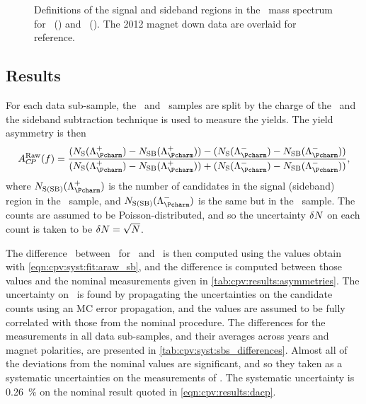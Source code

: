 \begin{figure}
\begin{subfigure}[b]{0.5\textwidth}
    \caption{\ppipi}
    \label{fig:cpv:syst:mass_windows:ppipi}
  \end{subfigure}
  \caption{%
    Definitions of the signal and sideband regions in the \PLambdac\ mass 
    spectrum for \pKK~() and 
    \ppipi~().
    The 2012 magnet down data are overlaid for reference.
  }
  \label{fig:cpv:syst:mass_windows}
\end{figure}

\subsection{Results}
\label{chap:cpv:syst:fit:results}

For each data sub-sample, the \pKK\ and \ppipi\ samples are split by the charge 
of the \PLambdac\ and the sideband subtraction technique is used to measure the 
yields.
The yield asymmetry is then
\begin{equation}
  \ARaw(f) = \frac{%
    (N_{\text{S}}(\PLambdac) - N_{\text{SB}}(\PLambdac)) -
    (N_{\text{S}}(\APLambdac) - N_{\text{SB}}(\APLambdac))
  }{%
    (N_{\text{S}}(\PLambdac) - N_{\text{SB}}(\PLambdac)) +
    (N_{\text{S}}(\APLambdac) - N_{\text{SB}}(\APLambdac))
  },
  \label{eqn:cpv:syst:fit:araw_sb}
\end{equation}
where $N_{\text{S(SB)}}(\PLambdac)$ is the number of candidates in the signal 
(sideband) region in the \PLambdac\ sample, and $N_{\text{S(SB)}}(\APLambdac)$ 
is the same but in the \APLambdac\ sample.
The counts are assumed to be Poisson-distributed, and so the uncertainty 
$\delta{N}$ on each count is taken to be $\delta{N} = \sqrt{N}$.

The difference \dACP\ between \ARaw\ for \pKK\ and \ppipi\ is then computed 
using the values obtain with \cref{eqn:cpv:syst:fit:araw_sb}, and the 
difference is computed between those values and the nominal measurements given 
in \cref{tab:cpv:results:asymmetries}.
The uncertainty on \ARaw\ is found by propagating the uncertainties on the 
candidate counts using an \ac{MC} error propagation, and the values are assumed 
to be fully correlated with those from the nominal procedure.
The differences for the measurements in all data sub-samples, and their 
averages across years and magnet polarities, are presented in 
\cref{tab:cpv:syst:sbs_differences}.
Almost all of the deviations from the nominal values are significant, and so 
they taken as a systematic uncertainties on the measurements of \dACP\@.
The systematic uncertainty is \SI{0.26}{\percent} on the nominal result quoted 
in \cref{eqn:cpv:results:dacp}.


